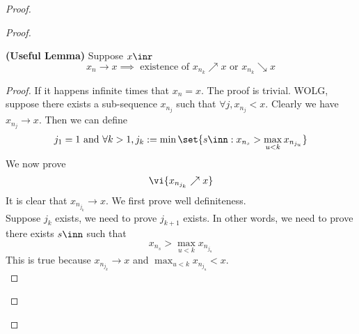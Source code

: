 \documentclass{report}
\begin{document}
\begin{proof}
\begin{proof}
{\begin{minipage}{39em}
\end{minipage}}
\begin{theorem}
\label{4.4.13}
\textbf{(Useful Lemma)} Suppose $x\inr$
 \begin{equation*}
x_n \to x \implies \text{ existence of  } x_{n_k} \nearrow x\text{ or }x_{n_k}\searrow x
\end{equation*}
\end{theorem}
\begin{proof}
If it happens infinite times that $x_n=x$. The proof is trivial. WOLG, suppose there exists a sub-sequence $x_{n_j}$ such that  $\forall j,x_{n_j}<x$. Clearly we have $x_{n_j}\to x$. Then we can define 
\begin{equation*}
j_1=1\text{ and }\forall k>1,  j_k:=\min \set{s \inn:x_{n_s}> \max_{u<k}x_{n_{j_u}}} 
\end{equation*}
We now prove 
\begin{equation*}
  \vi{x_{n_{j_k}}\nearrow x}
\end{equation*}
It is clear that $x_{n_{j_k}}\to x$. We first prove well definiteness.\\

Suppose $j_k$ exists, we need to prove $j_{k+1}$ exists. In other words, we need to prove there exists $s \inn$ such that 
\begin{equation*}
x_{n_s}>\max_{u<k}x_{n_{j_u}}
\end{equation*}
This is true because $x_{n_{j_k}}\to x$ and $\max_{u<k}x_{n_{j_u}}<x$.\\


\end{proof}
\end{proof}
\end{proof}
\end{document}
